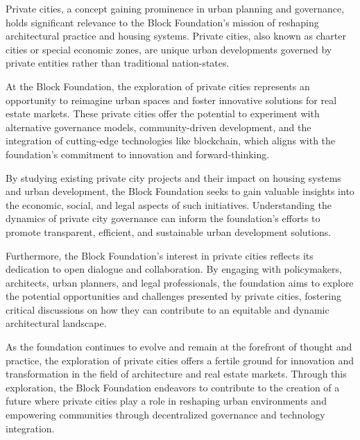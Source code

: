 Private cities, a concept gaining prominence in urban planning and governance, holds significant relevance to the Block Foundation's mission of reshaping architectural practice and housing systems. Private cities, also known as charter cities or special economic zones, are unique urban developments governed by private entities rather than traditional nation-states.

At the Block Foundation, the exploration of private cities represents an opportunity to reimagine urban spaces and foster innovative solutions for real estate markets. These private cities offer the potential to experiment with alternative governance models, community-driven development, and the integration of cutting-edge technologies like blockchain, which aligns with the foundation's commitment to innovation and forward-thinking.

By studying existing private city projects and their impact on housing systems and urban development, the Block Foundation seeks to gain valuable insights into the economic, social, and legal aspects of such initiatives. Understanding the dynamics of private city governance can inform the foundation's efforts to promote transparent, efficient, and sustainable urban development solutions.

Furthermore, the Block Foundation's interest in private cities reflects its dedication to open dialogue and collaboration. By engaging with policymakers, architects, urban planners, and legal professionals, the foundation aims to explore the potential opportunities and challenges presented by private cities, fostering critical discussions on how they can contribute to an equitable and dynamic architectural landscape.

As the foundation continues to evolve and remain at the forefront of thought and practice, the exploration of private cities offers a fertile ground for innovation and transformation in the field of architecture and real estate markets. Through this exploration, the Block Foundation endeavors to contribute to the creation of a future where private cities play a role in reshaping urban environments and empowering communities through decentralized governance and technology integration.
